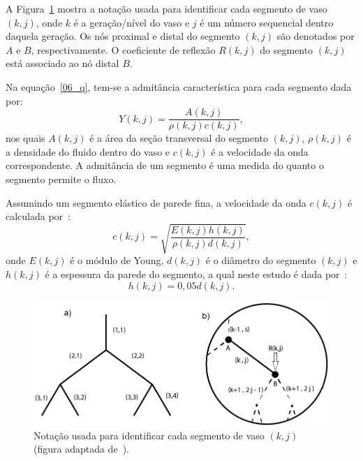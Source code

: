\documentclass[a4paper,12pt]{monografia}
\theoremstyle{plain}
\theoremstyle{definition}
\theoremstyle{remark}
\begin{document}
A Figura~\ref{fig1:arterial-tree} mostra a notação usada para identificar cada segmento de vaso $(k,j)$, onde $k$ é a geração/nível do vaso e $j$ é um número sequencial dentro daquela geração. Os nós proximal e distal do segmento $(k,j)$ são denotados por $A$ e $B$, respectivamente. O coeficiente de reflexão $R(k,j)$ do segmento $(k,j)$ está associado ao nó distal $B$.

Na equação~\eqref{06_q}, tem-se a admitância característica para cada segmento dada por:
\begin{equation}
	Y(k,j) = \frac{A(k,j)}{\rho(k,j)c(k,j)},
	\label{eq:admitancia}
\end{equation}
nos quais $A(k,j)$ é a área da seção transversal do segmento $(k,j)$, $\rho(k,j)$ é a densidade do fluido dentro do vaso e $c(k,j)$ é a velocidade da onda correspondente. A admitância de um segmento é uma medida do quanto o segmento permite o fluxo.

Assumindo um segmento elástico de parede fina, a velocidade da onda $c(k,j)$ é calculada
por~\cite{Fung}:
\begin{equation}
	c(k,j) = \sqrt{\frac{E(k,j) h(k,j)}{\rho(k,j) d(k,j)}},\label{eq:velocidade}
\end{equation}
onde $E(k,j)$ é o módulo de Young, $d(k,j)$ é o diâmetro do segmento $(k,j)$ e $h(k,j)$ é a espessura da parede do segmento, a qual neste estudo é dada por~\cite{Duan}: 
\begin{equation}
	h(k,j) = 0,05 d(k,j).
\end{equation}

\begin{figure}[h] 
	\begin{center}
		\includegraphics[scale = 0.5]{Figures/ArterialTree_Zamir.png}%
		\caption{Notação usada para identificar cada segmento de vaso $(k,j)$ (figura adaptada de~\cite{Duan}). }
		\label{fig1:arterial-tree}%
	\end{center}
\end{figure}
\end{document}
